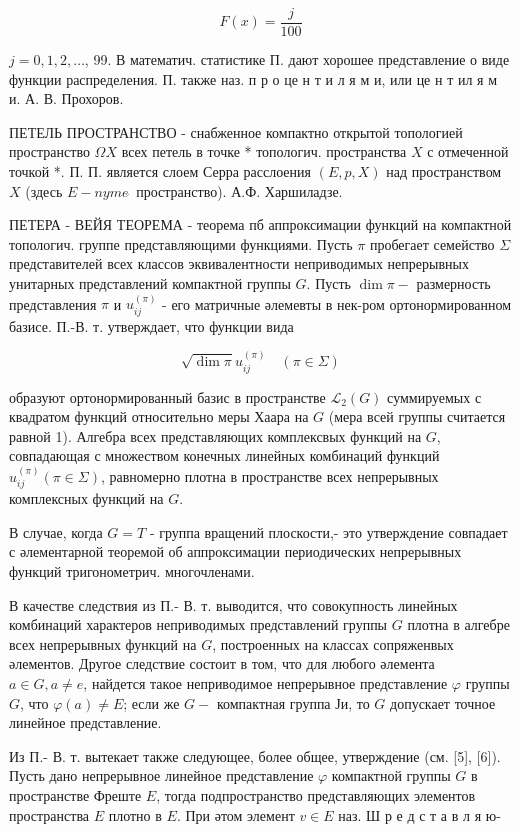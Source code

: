 \documentclass[10pt]{article}
\begin{document}
\[

F(x)=\frac{j}{100}

\]



$j=0,1,2, \ldots$, 99. В математич. статистике П. дают хорошее представление о виде функции распределения. П. также наз. п р о це н т и л я м и, или це н т ил я м и. А. В. Прохоров.



ПЕТЕЛЬ ПРОСТРАНСТВО - снабженное компактно открытой топологией пространство $\Omega X$ всех петель в точке * топологич. пространства $X$ с отмеченной точкой *. П. П. является слоем Серра расслоения $(E, p, X)$ над пространством $X$ (здесь $E-n y m e \ddot{~}$ пространство). А.Ф. Харшиладзе.



ПЕТЕРА - ВЕЙЯ ТЕОРЕМА - теорема пб аппроксимации функций на компактной топологич. группе представляющими функциями. Пусть $\pi$ пробегает семейство $\Sigma$ представителей всех классов эквивалентности неприводимых непрерывных унитарных представлений компактной группы $G$. Пусть $\operatorname{dim} \pi-$ размерность представления $\pi$ и $u_{i j}^{(\pi)}$ - его матричные әлемевты в нек-ром ортонормированном базисе. П.-В. т. утверждает, что функции вида



\[

\sqrt{\operatorname{dim} \pi} u_{i j}^{(\pi)} \quad(\pi \in \Sigma)

\]



образуют ортонормированный базис в пространстве $\mathscr{L}_{2}(G)$ суммируемых с квадратом функций относительно меры Хаара на $G$ (мера всей группы считается равной 1). Алгебра всех представляющих комплексвых функций на $G$, совпадающая с множеством конечных линейных комбинаций функций $u_{i j}^{(\pi)}(\pi \in \Sigma)$, равномерно плотна в пространстве всех непрерывных комплексных функций на $G$.



В случае, когда $G=T$ - группа вращений плоскости,- это утверждение совпадает с әлементарной теоремой об аппроксимации периодических непрерывных функций тригонометрич. многочленами.



В качестве следствия из П.- В. т. выводится, что совокупность линейных комбинаций характеров неприводимых представлений группы $G$ плотна в алгебре всех непрерывных функций на $G$, построенных на классах сопряженвых әлементов. Другое следствие состоит в том, что для любого әлемента $a \in G, a \neq e$, найдется такое неприводимое непрерывное представление $\varphi$ группы $G$, что $\varphi(a) \neq E$; если же $G-$ компактная группа Ји, то $G$ допускает точное линейное представление.



Из П.- В. т. вытекает также следующее, более общее, утверждение (см. [5], [6]). Пусть дано непрерывное линейное представление $\varphi$ компактной группы $G$ в пространстве Фреште $E$, тогда подпространство представляющих элементов пространства $E$ плотно в $E$. При әтом элемент $v \in E$ наз. Ш р е д с т а в л я ю-
\end{document}
